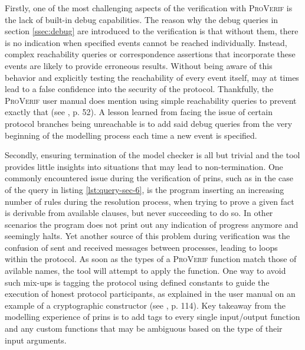 Firstly, one of the most challenging aspects of the verification with \textsc{ProVerif} is the lack of built-in debug capabilities.
The reason why the debug queries in section \ref{ssec:debug} are introduced to the verification is that without them, there is no indication when specified events cannot be reached individually.
Instead, complex reachability queries or correspondence assertions that incorporate these events are likely to provide erroneous results.
Without being aware of this behavior and explicitly testing the reachability of every event itself, may at times lead to a false confidence into the security of the protocol.
Thankfully, the \textsc{ProVerif} user manual does mention using simple reachability queries to prevent exactly that (see \cite{blanchet2020proverif}, p. 52).
A lesson learned from facing the issue of certain protocol branches being unreachable is to add said debug queries from the very beginning of the modelling process each time a new event is specified.\medskip

Secondly, ensuring termination of the model checker is all but trivial and the tool provides little insights into situations that may lead to non-termination.
One commonly encountered issue during the verification of \gls{prins}, such as in the case of the query in listing \ref{lst:query-sec-6}, is the program inserting an increasing number of rules during the resolution process, when trying to prove a given fact is derivable from available clauses, but never succeeding to do so.
In other scenarios the program does not print out any indication of progress anymore and seemingly halts.
Yet another source of this problem during verification was the confusion of sent and received messages between processes, leading to loops within the protocol.
As soon as the types of a \textsc{ProVerif} function match those of avilable names, the tool will attempt to apply the function.
One way to avoid such mix-ups is tagging the protocol using defined constants to guide the execution of honest protocol participants, as explained in the user manual on an example of a cryptographic constructor (see \cite{blanchet2020proverif}, p. 114).
Key takeaway from the modelling experience of \gls{prins} is to add tags to every single input/output function and any custom functions that may be ambiguous based on the type of their input arguments.

